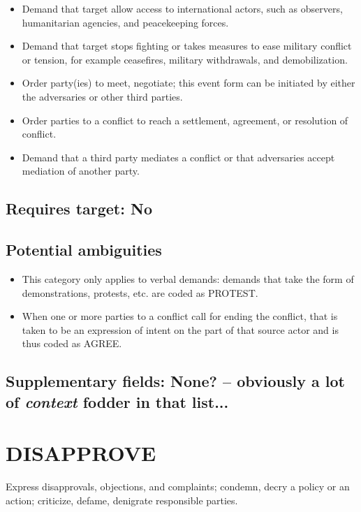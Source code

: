 \documentclass[11pt]{report}
\newcommand{\plcat}[1]{\textsf{#1}}
\newcommand{\ti}[1]{\textit{#1}}
\begin{document}
\begin{itemize}
\item Demand that target allow access to international actors, such as observers, humanitarian agencies, and peacekeeping forces.
\item Demand that target stops fighting or takes measures to ease military conflict or tension, for example ceasefires, military withdrawals, and demobilization.
\item Order party(ies) to meet, negotiate; this event form can be initiated by either the adversaries or other third parties.
\item Order parties to a conflict to reach a settlement, agreement, or resolution of conflict. 
\item Demand that a third party mediates a conflict or that adversaries accept mediation of another party.
\end{itemize}


\subsection{Requires target: No}


\subsection{Potential ambiguities}

\begin{itemize}
\item This category only applies to verbal demands: demands that take the form of demonstrations, protests, etc. are coded as \plcat{PROTEST}.
\item When one or more parties to a conflict call for ending the conflict, that is taken to be an expression of intent on the part of that source actor and is thus coded as \plcat{AGREE}.

\end{itemize}

\subsection{Supplementary fields: None? -- obviously a lot of \ti{context} fodder in that list...}

\newpage  


\section{DISAPPROVE}

Express disapprovals, objections, and complaints; condemn, decry a policy or an action; criticize, defame, denigrate responsible parties.
\end{document}
